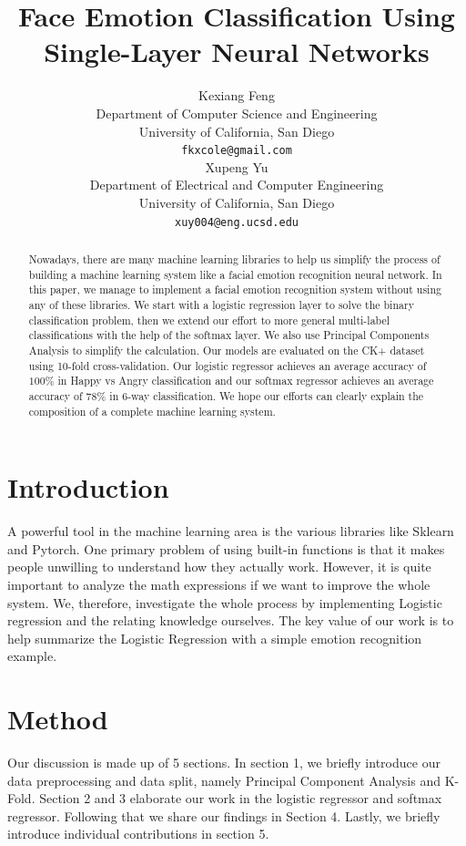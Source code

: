 \documentclass{article} %
\title{Face Emotion Classification Using Single-Layer Neural Networks}
\author{
Kexiang Feng \\
Department of Computer Science and Engineering\\
University of California, San Diego\\
\texttt{fkxcole@gmail.com} \\
\And
Xupeng Yu \\
Department of Electrical and Computer Engineering \\
University of California, San Diego \\
\texttt{xuy004@eng.ucsd.edu}
}
\begin{document}
\maketitle

\begin{abstract}
Nowadays, there are many machine learning libraries to help us simplify the process of building a machine learning system like a facial emotion recognition neural network. In this paper, we manage to implement a facial emotion recognition system without using any of these libraries. We start with a logistic regression layer to solve the binary classification problem, then we extend our effort to more general multi-label classifications with the help of the softmax layer. We also use Principal Components Analysis to simplify the calculation. Our models are evaluated on the CK+ dataset using 10-fold cross-validation. Our logistic regressor achieves an average accuracy of $ 100\% $ in Happy vs Angry classification and our softmax regressor achieves an average accuracy of 78\% in 6-way classification. We hope our efforts can clearly explain the composition of a complete machine learning system. 
\end{abstract}

\section{Introduction}
A powerful tool in the machine learning area is the various libraries like Sklearn and Pytorch. One primary problem of using built-in functions is that it makes people unwilling to understand how they actually work. However, it is quite important to analyze the math expressions if we want to improve the whole system. We, therefore, investigate the whole process by implementing Logistic regression and the relating knowledge ourselves. The key value of our work is to help summarize the Logistic Regression with a simple emotion recognition example.

\section{Method}
Our discussion is made up of 5 sections. In section 1, we briefly introduce our data preprocessing and data split, namely Principal Component Analysis and K-Fold. Section 2 and 3 elaborate our work in the logistic regressor and softmax regressor. Following that we share our findings in Section 4. Lastly, we briefly introduce individual contributions in section 5.
\end{document}
